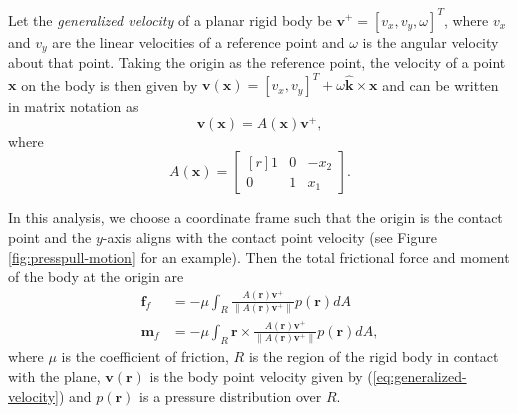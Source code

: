 \documentclass[conference]{IEEEtran}
\DeclareMathOperator{\sign}{\text{sgn}}
\begin{document}
Let the \textit{generalized velocity} of a planar rigid body be
$\mathbf{v}^+ = [v_x, v_y, \omega]^T$, where $v_x$ and $v_y$ are the
linear velocities of a reference point and $\omega$ is the angular
velocity about that point. Taking the origin as the reference point,
the velocity of a point $\mathbf{x}$ on the body is then given by
$\mathbf{v}(\mathbf{x}) = [v_x, v_y]^T + \omega\hat{\mathbf{k}} \times
\mathbf{x}$ and can be written in matrix notation as
\begin{equation} \label{eq:generalized-velocity}
\mathbf{v}(\mathbf{x}) = A(\mathbf{x})\mathbf{v}^+,
\end{equation}
where
\begin{equation}
  A(\mathbf{x}) = 
  \begin{bmatrix*}[r]
    1 & 0 & -x_2 \\
    0 & 1 &  x_1
  \end{bmatrix*}.
\end{equation}

In this analysis, we choose a coordinate frame such that the origin is
the contact point and the $y$-axis aligns with the contact point
velocity (see Figure \ref{fig:presspull-motion} for an example). Then
the total frictional force and moment of the body at the origin are
\begin{align}
  \mathbf{f}_f &= -\mu\int_{R}\frac{A(\mathbf{r})\mathbf{v}^+}{\lVert A(\mathbf{r})\mathbf{v}^+ \rVert} p(\mathbf{r}) dA \\
  \mathbf{m}_f &= -\mu\int_{R}\mathbf{r}\times\frac{A(\mathbf{r})\mathbf{v}^+}{\lVert A(\mathbf{r})\mathbf{v}^+ \rVert} p(\mathbf{r}) dA, \label{eq:moment-at-contact}
\end{align}
where $\mu$ is the coefficient of friction, $R$ is the region of the
rigid body in contact with the plane, $\mathbf{v}(\mathbf{r})$ is the
body point velocity given by (\ref{eq:generalized-velocity}) and
$p(\mathbf{r})$ is a pressure distribution over $R$.
\end{document}
